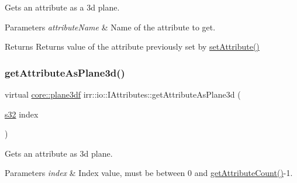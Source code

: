 Gets an attribute as a 3d plane. 


\begin{DoxyParams}{Parameters}
{\em attribute\+Name} & Name of the attribute to get. \\
\hline
\end{DoxyParams}
\begin{DoxyReturn}{Returns}
Returns value of the attribute previously set by \hyperlink{classirr_1_1io_1_1IAttributes_a03fa31acb481ae23678676cc183f09a6}{set\+Attribute()} 
\end{DoxyReturn}
\mbox{\label{classirr_1_1io_1_1IAttributes_adcb6bc5b7d76f8299b587b34b7dfaeee}} 
\subsubsection{\texorpdfstring{get\+Attribute\+As\+Plane3d()}{getAttributeAsPlane3d()}\hspace{0.1cm}{\footnotesize\ttfamily [3/4]}}
{\footnotesize\ttfamily virtual \hyperlink{namespaceirr_1_1core_a97c9b39d4c6f71dbd9ded0153c4fa7f7}{core\+::plane3df} irr\+::io\+::\+I\+Attributes\+::get\+Attribute\+As\+Plane3d (\begin{DoxyParamCaption}\item[{\hyperlink{namespaceirr_ac66849b7a6ed16e30ebede579f9b47c6}{s32}}]{index }\end{DoxyParamCaption})\hspace{0.3cm}{\ttfamily [pure virtual]}}



Gets an attribute as 3d plane. 


\begin{DoxyParams}{Parameters}
{\em index} & Index value, must be between 0 and \hyperlink{classirr_1_1io_1_1IAttributes_a796bdd9440ee7ba0b6742a90a82870b6}{get\+Attribute\+Count()}-\/1. \\
\hline
\end{DoxyParams}
\mbox{\label{classirr_1_1io_1_1IAttributes_adcb6bc5b7d76f8299b587b34b7dfaeee}} 
